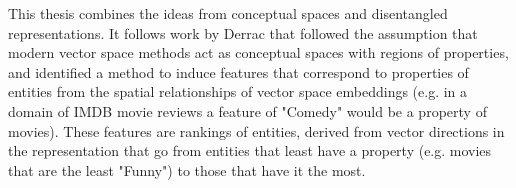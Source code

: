 







This thesis combines the ideas from conceptual spaces and disentangled representations. It follows work by Derrac \cite{Derrac2015} that followed the assumption that modern vector space methods act as conceptual spaces with regions of properties, and  identified a method to induce features that correspond to properties of entities from the spatial relationships of vector space embeddings (e.g. in a domain of IMDB movie reviews a feature of "Comedy" would be a property of movies).  These features are rankings of entities, derived from vector directions in the representation that go from entities that least have a property (e.g. movies that are the least "Funny") to those that  have it the most. 

